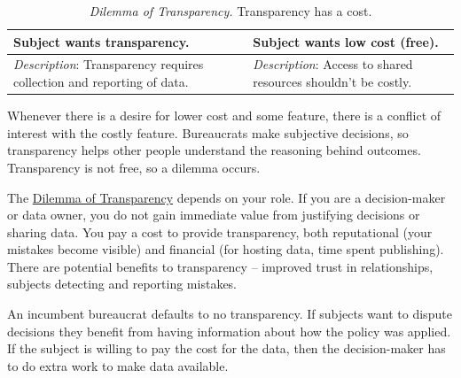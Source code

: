 \begin{center}
\begin{table}[H] %
\begin{tabular}{ | m{\dilemmatablewidth}| m{\dilemmatablewidth} | } 
  \hline
  \textbf{Subject wants transparency.} &
  \textbf{Subject wants low cost (free).} \\
  \hline
  \textit{Description}: Transparency requires collection and reporting of data. & 
  \textit{Description}: Access to shared resources shouldn't be costly. \\
  \hline
\end{tabular}
\caption{\textit{Dilemma of Transparency.}
Transparency has a cost.
}
\label{table:dilemma-subject-transparency}
\end{table}
\end{center}

Whenever there is a desire for lower cost and some feature, there is a conflict of interest with the costly feature. Bureaucrats make subjective decisions, so transparency helps other people understand the reasoning behind outcomes. Transparency is not free, so a dilemma occurs. 


The \hyperref[table:dilemma-subject-transparency]{Dilemma of Transparency} depends on your role. If you are a decision-maker or data owner, you do not gain immediate value from justifying decisions or sharing data. You pay a cost to provide transparency, both reputational (your mistakes become visible) and financial (for hosting data, time spent publishing). There are potential benefits to transparency -- improved trust in relationships, subjects detecting and reporting mistakes. 

An incumbent bureaucrat defaults to no transparency. If subjects want to dispute decisions they benefit from having information about how the policy was applied. If the subject is willing to pay the cost for the data, then the decision-maker has to do extra work to make data available.



